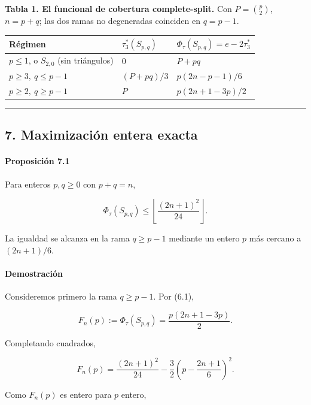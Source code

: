 \documentclass[
  spanish,
  11pt,
  a4paper,
]{article}
\newcounter{none} %
\begin{document}
\textbf{Tabla 1. El funcional de cobertura complete-split.} Con \(P=\binom p2\), \(n=p+q\); las dos ramas no degeneradas coinciden en \(q=p-1\).

{\def\LTcaptype{none} %
\begin{longtable}[]{@{}lll@{}}
\toprule\noalign{}
Régimen & \(\tau_3^*(S_{p,q})\) & \(\Phi_\tau(S_{p,q})=e-2\tau_3^*\) \\
\midrule\noalign{}
\endhead
\bottomrule\noalign{}
\endlastfoot
\(p\le1\), o \(S_{2,0}\) (sin triángulos) & \(0\) & \(P+pq\) \\
\(p\ge3,\ q\le p-1\) & \((P+pq)/3\) & \(p(2n-p-1)/6\) \\
\(p\ge2,\ q\ge p-1\) & \(P\) & \(p(2n+1-3p)/2\) \\
\end{longtable}
}

\begin{center}\rule{0.5\linewidth}{0.5pt}\end{center}

\subsection{7. Maximización entera exacta}\label{maximizaciuxf3n-entera-exacta}

\paragraph{Proposición 7.1}\label{proposiciuxf3n-7.1}

Para enteros \(p,q\ge0\) con \(p+q=n\),

\[
\Phi_\tau(S_{p,q})
\le
\left\lfloor\frac{(2n+1)^2}{24}\right\rfloor.
\]

La igualdad se alcanza en la rama \(q\ge p-1\) mediante un entero \(p\) más cercano a \((2n+1)/6\).

\paragraph{Demostración}\label{demostraciuxf3n-11}

Consideremos primero la rama \(q\ge p-1\). Por (6.1),

\[
F_n(p)
:=
\Phi_\tau(S_{p,q})
=
\frac{p(2n+1-3p)}2.
\]

Completando cuadrados,

\[
F_n(p)
=
\frac{(2n+1)^2}{24}
-
\frac32
\left(
p-\frac{2n+1}{6}
\right)^2.
\tag{7.1}
\]

Como \(F_n(p)\) es entero para \(p\) entero,
\end{document}

